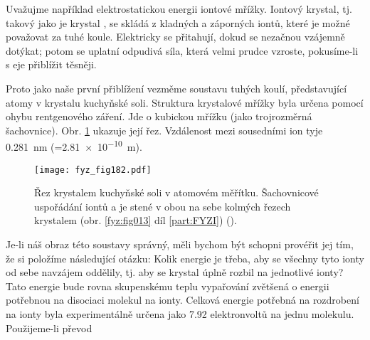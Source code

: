     Uvažujme například elektrostatickou energii iontové mřížky. Iontový krystal, tj. takový jako je
    krystal , se skládá z kladných a záporných iontů, které je možné považovat za tuhé
    koule. Elektricky se přitahují, dokud se nezačnou vzájemně dotýkat; potom se uplatní odpudivá
    síla, která velmi prudce vzroste, pokusíme-li s eje přiblížit těsněji.
    
    Proto jako naše první přiblížení vezměme soustavu tuhých koulí, představující atomy v krystalu
    kuchyňské soli. Struktura krystalové mřížky byla určena pomocí ohybu rentgenového záření. Jde o
    kubickou mřížku (jako trojrozměrná šachovnice). Obr. \ref{fyz:fig182} ukazuje její řez.
    Vzdálenost mezi sousedními ion tyje \SI{0.281}{\nm} (=\SI{2.81e-10}{\m}).
    
    \begin{figure}[ht!]  %
      \centering
      \texttt{[image: fyz\_fig182.pdf]}
      \caption{Řez krystalem kuchyňské soli v atomovém měřítku. Šachovnicové uspořádání iontů  
              a  je stené v obou na sebe kolmých řezech krystalem (obr. \ref{fyz:fig013} díl
              \ref{part:FYZI}) (\cite[s.~146]{Feynman02}).}
      \label{fyz:fig182}
    \end{figure}

    Je-li náš obraz této soustavy správný, měli bychom být schopni provéřit jej tím, že si položíme
    následující otázku: Kolik energie je třeba, aby se všechny tyto ionty od sebe navzájem oddělily,
    tj. aby se krystal úplně rozbil na jednotlivé ionty? Tato energie bude rovna skupenskému teplu
    vypařování  zvětšená o energii potřebnou na disociaci molekul na ionty. Celková energie
    potřebná na rozdrobení  na ionty byla experimentálně určena jako \num{7.92}
    elektronvoltů na jednu molekulu. Použijeme-li převod

